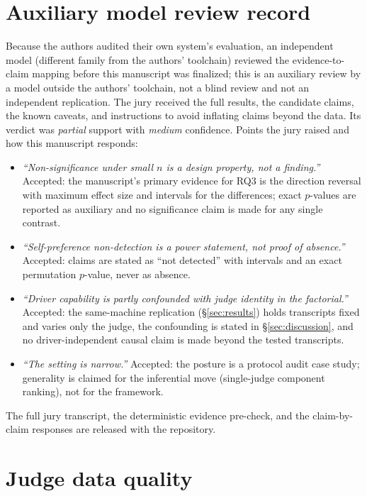 \appendix
\section{Auxiliary model review record}
\label{app:jury}

Because the authors audited their own system's evaluation, an
independent model (different family from the authors' toolchain)
reviewed the evidence-to-claim mapping before this manuscript was
finalized; this is an auxiliary review by a model outside the authors'
toolchain, not a blind review and not an independent replication. The jury received the full results, the candidate claims,
the known caveats, and instructions to avoid inflating claims beyond
the data. Its verdict was \emph{partial} support with \emph{medium}
confidence. Points the jury raised and how this manuscript responds:

\begin{itemize}
\item \emph{``Non-significance under small $n$ is a design property,
not a finding.''} Accepted: the manuscript's primary evidence for RQ3
is the direction reversal with maximum effect size and intervals for
the differences; exact $p$-values are reported as auxiliary and no
significance claim is made for any single contrast.
\item \emph{``Self-preference non-detection is a power statement, not
proof of absence.''} Accepted: claims are stated as ``not detected''
with intervals and an exact permutation $p$-value, never as absence.
\item \emph{``Driver capability is partly confounded with judge identity
in the factorial.''} Accepted: the same-machine replication
(\S\ref{sec:results}) holds transcripts fixed and varies only the
judge, the confounding is stated in \S\ref{sec:discussion}, and no
driver-independent causal claim is made beyond the tested transcripts.
\item \emph{``The setting is narrow.''} Accepted: the posture is a
protocol audit case study; generality is claimed for the inferential
move (single-judge component ranking), not for the framework.
\end{itemize}

The full jury transcript, the deterministic evidence pre-check, and
the claim-by-claim responses are released with the repository.

\section{Judge data quality}
\label{app:quality}

